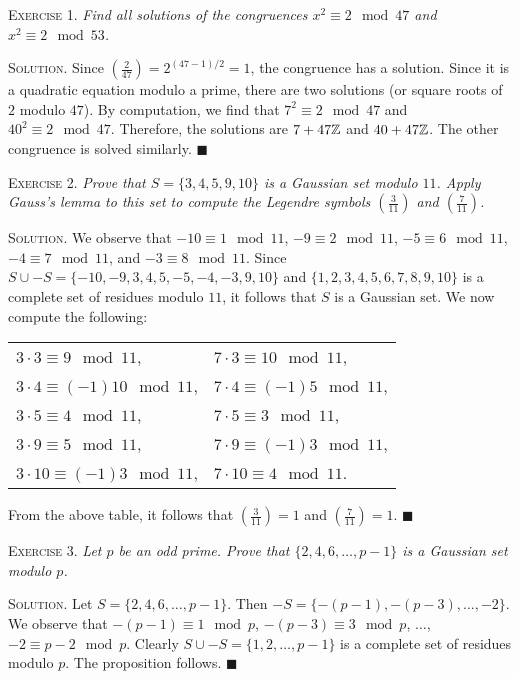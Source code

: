 \documentclass[11pt, leqno]{article}
\newcommand{\done}{\ensuremath{\blacksquare}}
\begin{document}
\textsc{Exercise 1}. \emph{Find all solutions of the congruences $x^2 \equiv 2 \mod 47$ and $x^2 \equiv 2 \mod 53$.}

\textsc{Solution}. Since $\left( \frac{2}{47} \right) = 2^{(47-1)/2} = 1$, the congruence has a solution. Since it is a quadratic equation modulo a prime, there are two solutions (or square roots of $2$ modulo $47$). By computation, we find that $7^2 \equiv 2 \mod 47$ and $40^2 \equiv 2 \mod 47$. Therefore, the solutions are $7+47\mathbb{Z}$ and $40+47\mathbb{Z}$. The other congruence is solved similarly. \done

\textsc{Exercise 2}. \emph{Prove that $S=\{3, 4, 5, 9, 10\}$ is a Gaussian set modulo $11$. Apply Gauss's lemma to this set to compute the Legendre symbols $\left(\frac{3}{11}\right)$ and $\left(\frac{7}{11}\right)$.}

\textsc{Solution}. We observe that $-10 \equiv 1 \mod 11$, $-9 \equiv 2 \mod 11$, $-5 \equiv 6 \mod 11$, $-4 \equiv 7 \mod 11$, and $-3 \equiv 8 \mod 11$. Since $S\cup -S = \{-10, -9, 3, 4, 5, -5, -4, -3, 9, 10\}$ and $\{1, 2, 3, 4, 5, 6, 7, 8, 9, 10\}$ is a complete set of residues modulo $11$, it follows that $S$ is a Gaussian set. We now compute the following:
\begin{longtable}{p{12em} p{12em}}
  $3 \cdot 3 \equiv 9 \mod 11$, & $7 \cdot 3 \equiv 10 \mod 11$,\\
  $3 \cdot 4 \equiv (-1)10 \mod 11$, & $7 \cdot 4 \equiv (-1)5 \mod 11$,\\
  $3 \cdot 5 \equiv 4 \mod 11$, & $7 \cdot 5 \equiv 3 \mod 11$,\\
  $3 \cdot 9 \equiv 5 \mod 11$, & $7 \cdot 9 \equiv (-1)3 \mod 11$,\\
  $3 \cdot 10 \equiv (-1)3 \mod 11$, & $7 \cdot 10 \equiv 4 \mod 11$.\\
\end{longtable}
\reduce

From the above table, it follows that $\left(\frac{3}{11}\right) = 1$ and $\left(\frac{7}{11}\right) = 1$. \done

\textsc{Exercise 3}. \emph{Let $p$ be an odd prime. Prove that $\{2, 4, 6, \ldots, p-1\}$ is a Gaussian set modulo $p$.}

\textsc{Solution}. Let $S=\{2, 4, 6, \ldots, p-1\} $. Then $-S = \{-(p-1), -(p-3), \ldots, -2\}$. We observe that $-(p-1) \equiv 1 \mod p$, $-(p-3) \equiv 3 \mod p$, $\ldots$, $-2 \equiv p-2 \mod p$. Clearly $S\cup -S = \{1, 2, \ldots, p-1\}$ is a complete set of residues modulo $p$. The proposition follows. \done
\end{document}
